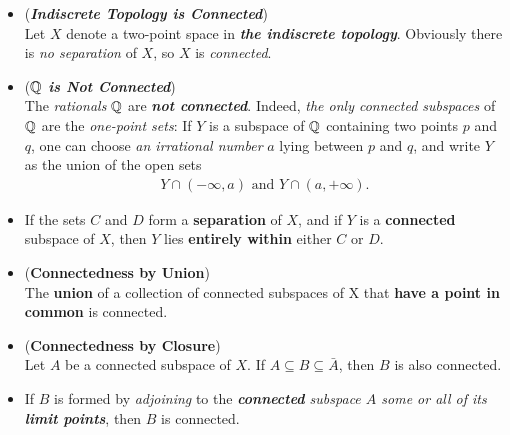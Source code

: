 \documentclass[11pt]{article}
\begin{document}
\begin{itemize}
\item \begin{example} (\emph{\textbf{Indiscrete Topology is Connected}})\\
Let $X$ denote a two-point space in \emph{\textbf{the indiscrete topology}}. Obviously there is \emph{no separation} of $X$, so $X$ is \emph{connected}.
\end{example}

\item \begin{example} (\emph{\textbf{${\mathbb Q}$ is Not Connected}})\\
The \emph{rationals} ${\mathbb Q}$ are \emph{\textbf{not connected}}. Indeed, \emph{the only connected subspaces} of ${\mathbb Q}$ are the \emph{one-point sets}: If $Y$ is a subspace of ${\mathbb Q}$ containing two points $p$ and $q$, one can choose \emph{an irrational number} $a$ lying between $p$ and $q$, and write $Y$ as the union of the open
sets
\begin{align*}
Y \cap (-\infty, a)\text{ and }Y \cap (a, +\infty).
\end{align*}
\end{example}

\item \begin{lemma}
If the sets $C$ and $D$ form a \textbf{separation} of $X$, and if $Y$ is a \textbf{connected} subspace of $X$, then $Y$ lies \textbf{entirely within} either $C$ or $D$.
\end{lemma}

\item \begin{proposition} (\textbf{Connectedness by Union}) \citep{munkres2000topology}\\
The \textbf{union} of a collection of connected subspaces of X that \textbf{have a point in common} is connected.
\end{proposition}

\item \begin{proposition} (\textbf{Connectedness by Closure})\citep{munkres2000topology} \\
Let $A$ be a connected subspace of $X$. If $A \subseteq B \subseteq  \bar{A}$, then $B$ is also connected.
\end{proposition}

\item \begin{remark}
If $B$ is formed by \emph{adjoining} to the \emph{\textbf{connected} subspace $A$ some or all of its \textbf{limit points}}, then $B$ is connected.
\end{remark}


\end{itemize}
\end{document}
